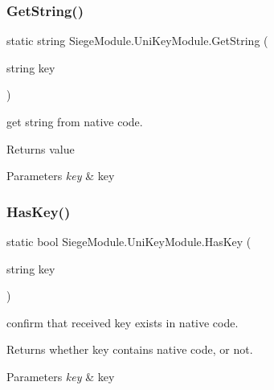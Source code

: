 \subsubsection{\texorpdfstring{Get\+String()}{GetString()}}
{\footnotesize\ttfamily static string Siege\+Module.\+Uni\+Key\+Module.\+Get\+String (\begin{DoxyParamCaption}\item[{string}]{key }\end{DoxyParamCaption})\hspace{0.3cm}{\ttfamily [static]}}



get string from native code. 

\begin{DoxyReturn}{Returns}
value
\end{DoxyReturn}

\begin{DoxyParams}{Parameters}
{\em key} & key\\
\hline
\end{DoxyParams}
\mbox{\label{class_siege_module_1_1_uni_key_module_a55044c9eefa50b2157b1214903616fdc}} 
\subsubsection{\texorpdfstring{Has\+Key()}{HasKey()}}
{\footnotesize\ttfamily static bool Siege\+Module.\+Uni\+Key\+Module.\+Has\+Key (\begin{DoxyParamCaption}\item[{string}]{key }\end{DoxyParamCaption})\hspace{0.3cm}{\ttfamily [static]}}



confirm that received key exists in native code. 

\begin{DoxyReturn}{Returns}
whether key contains native code, or not.
\end{DoxyReturn}

\begin{DoxyParams}{Parameters}
{\em key} & key\\
\hline
\end{DoxyParams}
\mbox{\label{class_siege_module_1_1_uni_key_module_ab17cd59318975668525fcf694b5dd88d}} 
